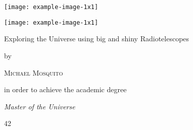 \documentclass{report}
\begin{document}
\begin{titlepage}
	\noindent
	\begin{minipage}[c][\textheight]{.15\textwidth}%
		\texttt{[image: example-image-1x1]}

		\vfill

		\texttt{[image: example-image-1x1]}
	\end{minipage}\hfill
	\begin{minipage}[c][\textheight]{.7\textwidth}
		\centering
		\vspace*{8\baselineskip}
		{\Huge 
		Exploring the Universe using big and shiny Radiotelescopes \par}
		\vspace{4\baselineskip}
		by\par\vspace{\baselineskip}
		{\Large\textsc{Michael Mosquito}\par}
		\vfill
		in order to achieve the academic degree\par
		{\itshape Master of the Universe\par}
		\vspace{6\baselineskip}
		\LARGE 42
	\end{minipage}%
\end{titlepage}
\end{document}
